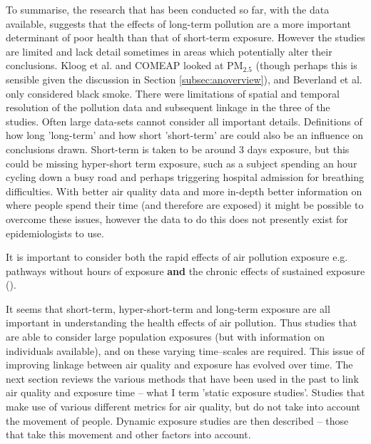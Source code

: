 To summarise, the research that has been conducted so far, with the data available, suggests that the effects of long-term pollution are a more important determinant of poor health than that of short-term exposure. However the studies are limited and lack detail sometimes in areas which potentially alter their conclusions. Kloog et al. and COMEAP looked at PM$_{2.5}$ (though perhaps this is sensible given the discussion in Section \ref{subsec:anoverview}), and Beverland et al. only considered black smoke. There were limitations of spatial and temporal resolution of the pollution data and subsequent linkage in the three of the studies. Often large data-sets cannot consider all important details. Definitions of how long 'long-term' and how short 'short-term' are could also be an influence on conclusions drawn. Short-term is taken to be around 3 days exposure, but this could be missing hyper-short term exposure, such as a subject spending an hour cycling down a busy road and perhaps triggering hospital admission for breathing difficulties. With better air quality data and more in-depth better information on where people spend their time (and therefore are exposed) it might be possible to overcome these issues, however the data to do this does not presently exist for epidemiologists to use.

It is important to consider both the rapid effects of air pollution exposure e.g. pathways without hours of exposure \textbf{and} the chronic effects of sustained exposure (\cite{Brook2010}).

It seems that short-term, hyper-short-term and long-term exposure are all important in understanding the health effects of air pollution. Thus studies that are able to consider large population exposures (but with information on individuals available), and on these varying time--scales are required. This issue of improving linkage between air quality and exposure has evolved over time. The next section reviews the various methods that have been used in the past to link air quality and exposure time -- what I term 'static exposure studies'. Studies that make use of various different metrics for air quality, but do not take into account the movement of people. Dynamic exposure studies are then described -- those that take this movement and other factors into account.\hfill


